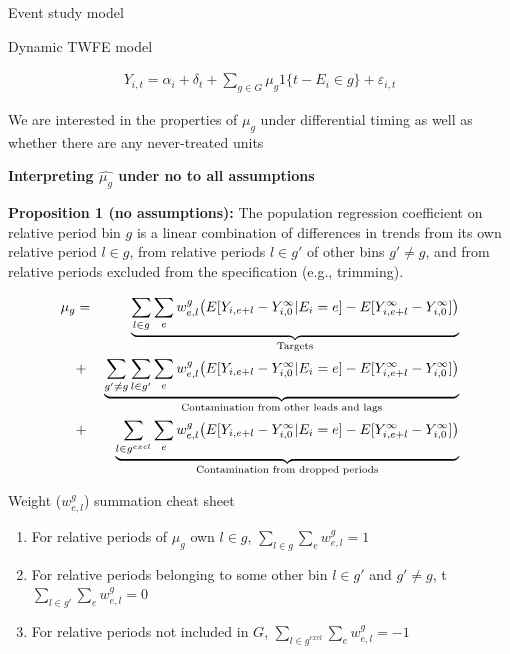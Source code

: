 \documentclass{beamer}
\begin{document}
\begin{frame}{Event study model}

Dynamic TWFE model

\begin{eqnarray*}
Y_{i,t} = \alpha_i + \delta_t + \sum_{g \in G} \mu_g1\{t-E_i \in g \} + \varepsilon_{i,t}
\end{eqnarray*}

\bigskip

We are interested in the properties of $\mu_g$ under differential timing as well as whether there are any never-treated units

\end{frame}



\begin{frame}[plain, shrink=20]
\begin{center}
\textbf{Interpreting $\widehat{\mu_g}$ under no to all assumptions}
\end{center}

\textbf{Proposition 1 (no assumptions):} The population regression coefficient on relative period bin $g$ is a linear combination of differences in trends from its own relative period $l \in g$, from relative periods $l \in g'$ of other bins $g' \neq g$, and from relative periods excluded from the specification (e.g., trimming). 

\begin{eqnarray*}
\mu_g &=& \underbrace{\sum_{l \in g} \sum_{e} w^g_{e,l} \big ( E[Y_{i,e+l} - Y^{\infty}_{i,0} | E_i = e] - E[Y^{\infty}_{i,e+l} - Y^{\infty}_{i,0}] \big )}_{\mathclap{\text{Targets}}} \\
&+& \underbrace{\sum_{g' \neq g} \sum_{l \in g'} \sum_e w^g_{e,l} \big ( E[Y_{i,e+l} - Y^{\infty}_{i,0} | E_i=e] - E[Y^{\infty}_{i,e+l} - Y^{\infty}_{i,0}] \big )}_{\mathclap{\text{Contamination from other leads and lags}}} \\
&+&  \underbrace{\sum_{l \in g^{excl}} \sum_{e} w^g_{e,l} \big ( E[Y_{i,e+l} - Y^{\infty}_{i,0} | E_i=e] - E[Y^{\infty}_{i,e+l} - Y^{\infty}_{i,0}] \big )}_{\mathclap{\text{Contamination from dropped periods}}} 
\end{eqnarray*}

\bigskip


\end{frame}

\begin{frame}{Weight ($w^g_{e,l}$) summation cheat sheet}

\begin{enumerate}
\item For relative periods of $\mu_g$ own $l \in g$, $\sum_{l \in g}\sum_ew^g_{e,l}=1$
\item For relative periods belonging to some other bin $l\in g'$ and $g' \neq g$, t $\sum_{l \in g'}\sum_ew^g_{e,l} = 0$
\item For relative periods not included in $G$, $\sum_{l \in g^{excl}} \sum_e w^g_{e,l} = -1$
\end{enumerate}

\end{frame}
\end{document}
